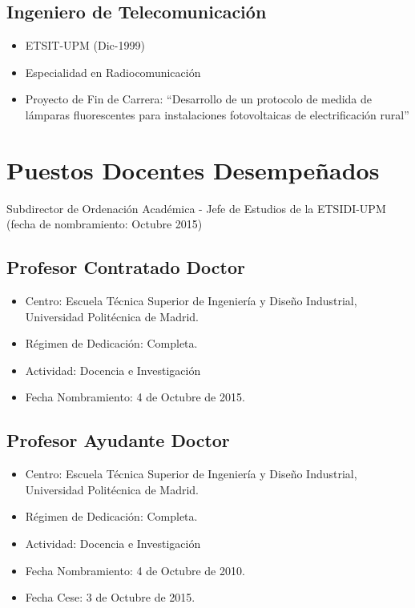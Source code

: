 \documentclass[article, a4paper]{memoir}
\begin{document}
\subsection{Ingeniero de Telecomunicación}
\label{sec:orgheadline5}
\begin{itemize}
\item ETSIT-UPM (Dic-1999)
\item Especialidad en Radiocomunicación
\item Proyecto de Fin de Carrera: ``Desarrollo de un protocolo de medida de lámparas fluorescentes para instalaciones fotovoltaicas de electrificación rural''
\end{itemize}

\newpage
\section{Puestos Docentes Desempeñados}
\label{sec:orgheadline10}

Subdirector de Ordenación Académica - Jefe de Estudios de la ETSIDI-UPM (fecha de nombramiento: Octubre 2015)

\subsection{Profesor Contratado Doctor}
\label{sec:orgheadline7}
\begin{itemize}
\item Centro: Escuela Técnica Superior de Ingeniería y Diseño Industrial, Universidad Politécnica de Madrid.
\item Régimen de Dedicación: Completa.
\item Actividad: Docencia e Investigación
\item Fecha Nombramiento: 4 de Octubre de 2015.
\end{itemize}

\subsection{Profesor Ayudante Doctor}
\label{sec:orgheadline8}
\begin{itemize}
\item Centro: Escuela Técnica Superior de Ingeniería y Diseño Industrial, Universidad Politécnica de Madrid.
\item Régimen de Dedicación: Completa.
\item Actividad: Docencia e Investigación
\item Fecha Nombramiento: 4 de Octubre de 2010.
\item Fecha Cese: 3 de Octubre de 2015.
\end{itemize}
\end{document}
